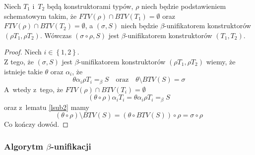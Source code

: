 \documentclass[11pt,leqno]{article}
\begin{document}
\begin{lemat}
Niech $T_1$ i~$T_2$ będą konstruktorami typów, $\rho$ niech będzie podstawieniem schematowym takim, że 
$FTV(\rho) \cap BTV(T_1) = \emptyset$ oraz $FTV(\rho) \cap BTV(T_2) = \emptyset$, a $(\sigma, S)$ niech będzie 
\mbox{$\beta$-unifikatorem} konstruktorów $(\rho T_1, \rho T_2)$.
Wówczas $(\sigma \circ \rho, S)$ jest $\beta$-unifikatorem konstruktorów $(T_1, T_2)$.
\label{lunif2}
\end{lemat}
\begin{proof}
Niech $i \in \left\{1,2\right\}$.\\
Z tego, że $(\sigma, S)$ jest $\beta$-unifikatorem konstruktorów $(\rho T_1, \rho T_2)$ wiemy, że istnieje takie
$\theta$ oraz $\alpha_i$, że
\[
\theta \alpha_i \rho T_i =_\beta S \quad \textrm{oraz} \quad \theta \setminus BTV(S) = \sigma
\]
A~wtedy z~tego, że $FTV(\rho) \cap BTV(T_i) = \emptyset$
\[
(\theta \circ \rho) \alpha_i T_i = \theta \alpha_i \rho T_i =_\beta S
\]
oraz z~lematu \ref{lsub2} mamy
\[
(\theta \circ \rho) \setminus BTV(S) = (\theta \circ BTV(S)) \circ \rho = \sigma \circ \rho
\]
Co kończy dowód.
\end{proof}

\subsubsection{Algorytm $\beta$-unifikacji}
\end{document}
